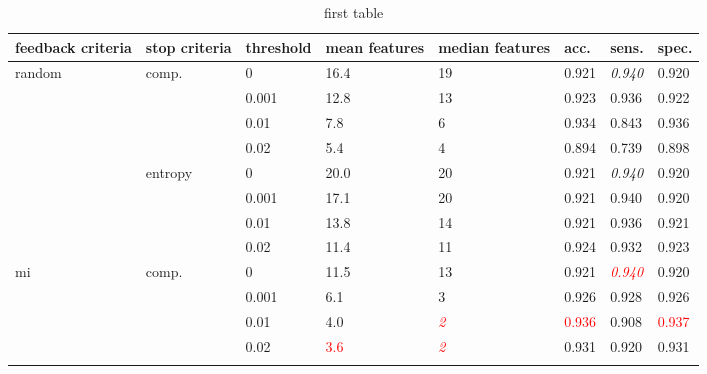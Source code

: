 \begin{table}[h]
	\centering
	\caption{first table}
	\label{my-label}
	\begin{tabularx}{\textwidth}{|X|X|X|X|X|X|X|X|}
		\hline
		feedback criteria        & stop criteria            & threshold & mean features & median features  & acc.           & sens.                & spec.          \\ \hline
		\multirow{8}{*}{random}  & \multirow{4}{*}{comp.}   & 0         & 16.4          & 19               & 0.921          & \textit{0.940}       & 0.920          \\ \cline{3-8} 
		&                          & 0.001     & 12.8          & 13               & 0.923          & 0.936                & 0.922          \\ \cline{3-8} 
		&                          & 0.01      & 7.8           & 6                & 0.934          & 0.843                & 0.936          \\ \cline{3-8} 
		&                          & 0.02      & 5.4           & 4                & 0.894          & 0.739                & 0.898          \\ \cline{2-8} 
		& \multirow{4}{*}{entropy} & 0         & 20.0          & 20               & 0.921          & \textit{0.940}       & 0.920          \\ \cline{3-8} 
		&                          & 0.001     & 17.1          & 20               & 0.921          & 0.940                & 0.920          \\ \cline{3-8} 
		&                          & 0.01      & 13.8          & 14               & 0.921          & 0.936                & 0.921          \\ \cline{3-8} 
		&                          & 0.02      & 11.4          & 11               & 0.924          & 0.932                & 0.923          \\ \hline
		\multirow{8}{*}{mi}      & \multirow{4}{*}{comp.}   & 0         & 11.5          & 13               & 0.921          & \textcolor{red}{\textit{0.940}} & 0.920          \\ \cline{3-8} 
		&                          & 0.001     & 6.1           & 3                & 0.926          & 0.928                & 0.926          \\ \cline{3-8} 
		&                          & 0.01      & 4.0           & \textcolor{red}{\textit{2}} & \textcolor{red}{0.936}    & 0.908                & \textcolor{red}{0.937}    \\ \cline{3-8} 
		&                          & 0.02      & \textcolor{red}{3.6}     & \textcolor{red}{\textit{2}} & 0.931          & 0.920                & 0.931          \\ \cline{2-8} 

\end{tabularx}
\end{table}
